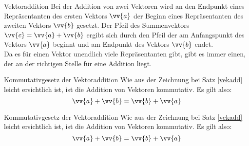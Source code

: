 \begin{satz}{Vektoraddition}{}\label{vekadd}
Bei der Addition von zwei Vektoren wird an den Endpunkt eines Repräsentanten des ersten Vektors $\vv{a}$ der Beginn eines Repräsentanten des zweiten Vektors $\vv{b}$ gesetzt. Der Pfeil des Summenvektors $\vv{c} = \vv{a} + \vv{b}$ ergibt sich durch den Pfeil der am Anfangspunkt des Vektors $\vv{a}$ beginnt und am Endpunkt des Vektors $\vv{b}$ endet.\\
Da es für einen Vektor unendlich viele Repräsentanten gibt, gibt es immer einen, der an der \glqq richtigen\grqq{} Stelle für eine Addition liegt.
\begin{center}
 
\end{center}
\end{satz}
\begin{satz}{Kommutativgesetz der Vektoraddition}{}\label{komuvekadd}
  Wie aus der Zeichnung bei Satz \ref{vekadd} leicht ersichtlich ist, ist die Addition von Vektoren kommutativ. Es gilt also: $$\vv{a} + \vv{b} = \vv{b} +\vv{a}$$ 
\end{satz}
\begin{satz}{Kommutativgesetz der Vektoraddition}{}
  Wie aus der Zeichnung bei Satz \ref{vekadd} leicht ersichtlich ist, ist die Addition von Vektoren kommutativ. Es gilt also: $$\vv{a} + \vv{b} = \vv{b} +\vv{a}$$ 
\end{satz}


